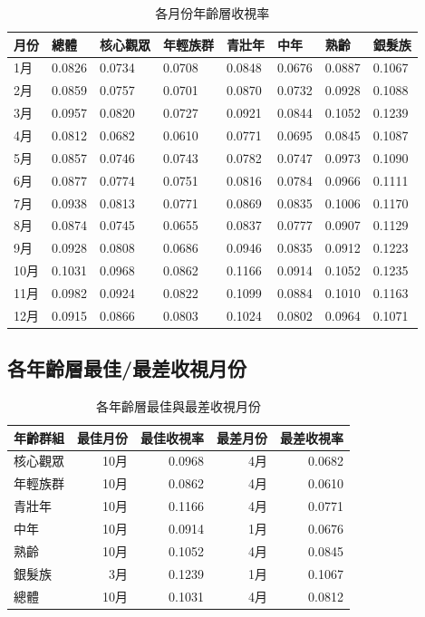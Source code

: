 \documentclass[11pt,a4paper]{article}
\begin{document}
\begin{table}[H]
\centering
\caption{各月份年齡層收視率}
\tiny
\begin{adjustbox}{width=\textwidth,center}
\begin{tabular}{lC{1.2cm}C{1.2cm}C{1.2cm}C{1.2cm}C{1.2cm}C{1.2cm}C{1.2cm}}
\toprule
\textbf{月份} & \textbf{總體} & \textbf{核心觀眾} & \textbf{年輕族群} & \textbf{青壯年} & \textbf{中年} & \textbf{熟齡} & \textbf{銀髮族} \\
\midrule
1月 & 0.0826 & 0.0734 & 0.0708 & 0.0848 & 0.0676 & 0.0887 & 0.1067 \\
2月 & 0.0859 & 0.0757 & 0.0701 & 0.0870 & 0.0732 & 0.0928 & 0.1088 \\
3月 & 0.0957 & 0.0820 & 0.0727 & 0.0921 & 0.0844 & 0.1052 & 0.1239 \\
4月 & 0.0812 & 0.0682 & 0.0610 & 0.0771 & 0.0695 & 0.0845 & 0.1087 \\
5月 & 0.0857 & 0.0746 & 0.0743 & 0.0782 & 0.0747 & 0.0973 & 0.1090 \\
6月 & 0.0877 & 0.0774 & 0.0751 & 0.0816 & 0.0784 & 0.0966 & 0.1111 \\
7月 & 0.0938 & 0.0813 & 0.0771 & 0.0869 & 0.0835 & 0.1006 & 0.1170 \\
8月 & 0.0874 & 0.0745 & 0.0655 & 0.0837 & 0.0777 & 0.0907 & 0.1129 \\
9月 & 0.0928 & 0.0808 & 0.0686 & 0.0946 & 0.0835 & 0.0912 & 0.1223 \\
10月 & 0.1031 & 0.0968 & 0.0862 & 0.1166 & 0.0914 & 0.1052 & 0.1235 \\
11月 & 0.0982 & 0.0924 & 0.0822 & 0.1099 & 0.0884 & 0.1010 & 0.1163 \\
12月 & 0.0915 & 0.0866 & 0.0803 & 0.1024 & 0.0802 & 0.0964 & 0.1071 \\

\bottomrule
\end{tabular}
\end{adjustbox}
\end{table}

\subsection{各年齡層最佳/最差收視月份}

\begin{table}[H]
\centering
\caption{各年齡層最佳與最差收視月份}
\begin{tabular}{lrrrr}
\toprule
年齡群組 & 最佳月份 & 最佳收視率 & 最差月份 & 最差收視率 \\
\midrule
核心觀眾 & 10月 & 0.0968 & 4月 & 0.0682 \\
年輕族群 & 10月 & 0.0862 & 4月 & 0.0610 \\
青壯年 & 10月 & 0.1166 & 4月 & 0.0771 \\
中年 & 10月 & 0.0914 & 1月 & 0.0676 \\
熟齡 & 10月 & 0.1052 & 4月 & 0.0845 \\
銀髮族 & 3月 & 0.1239 & 1月 & 0.1067 \\
總體 & 10月 & 0.1031 & 4月 & 0.0812 \\

\bottomrule
\end{tabular}
\end{table}
\end{document}
